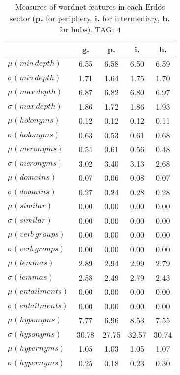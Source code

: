 \begin{table}[h!]
\begin{center}
\begin{tabular}{| l || c | c | c | c |}\hline
 & {\bf g.} & {\bf p.} & {\bf i.} & {\bf h.} \\\hline\hline
$\mu(min\,depth)$ & 6.55  & 6.58  & 6.50  & 6.59 \\
$\sigma(min\,depth)$ & 1.71  & 1.64  & 1.75  & 1.70 \\\hline
$\mu(max\,depth)$ & 6.87  & 6.82  & 6.80  & 6.97 \\
$\sigma(max\,depth)$ & 1.86  & 1.72  & 1.86  & 1.93 \\\hline
$\mu(holonyms)$ & 0.12  & 0.12  & 0.12  & 0.11 \\
$\sigma(holonyms)$ & 0.63  & 0.53  & 0.61  & 0.68 \\\hline
$\mu(meronyms)$ & 0.54  & 0.61  & 0.56  & 0.48 \\
$\sigma(meronyms)$ & 3.02  & 3.40  & 3.13  & 2.68 \\\hline
$\mu(domains)$ & 0.07  & 0.06  & 0.08  & 0.07 \\
$\sigma(domains)$ & 0.27  & 0.24  & 0.28  & 0.28 \\\hline
$\mu(similar)$ & 0.00  & 0.00  & 0.00  & 0.00 \\
$\sigma(similar)$ & 0.00  & 0.00  & 0.00  & 0.00 \\\hline
$\mu(verb\,groups)$ & 0.00  & 0.00  & 0.00  & 0.00 \\
$\sigma(verb\,groups)$ & 0.00  & 0.00  & 0.00  & 0.00 \\\hline
$\mu(lemmas)$ & 2.89  & 2.94  & 2.99  & 2.79 \\
$\sigma(lemmas)$ & 2.58  & 2.49  & 2.79  & 2.43 \\\hline
$\mu(entailments)$ & 0.00  & 0.00  & 0.00  & 0.00 \\
$\sigma(entailments)$ & 0.00  & 0.00  & 0.00  & 0.00 \\\hline
$\mu(hyponyms)$ & 7.77  & 6.96  & 8.53  & 7.55 \\
$\sigma(hyponyms)$ & 30.78  & 27.75  & 32.57  & 30.74 \\\hline
$\mu(hypernyms)$ & 1.05  & 1.03  & 1.05  & 1.07 \\
$\sigma(hypernyms)$ & 0.25  & 0.18  & 0.23  & 0.30 \\\hline
\end{tabular}
\caption{Measures of wordnet features in each Erd\"os sector ({{\bf p.}} for periphery, {{\bf i.}} for intermediary, {{\bf h.}} for hubs). TAG: 4}
\end{center}
\end{table}